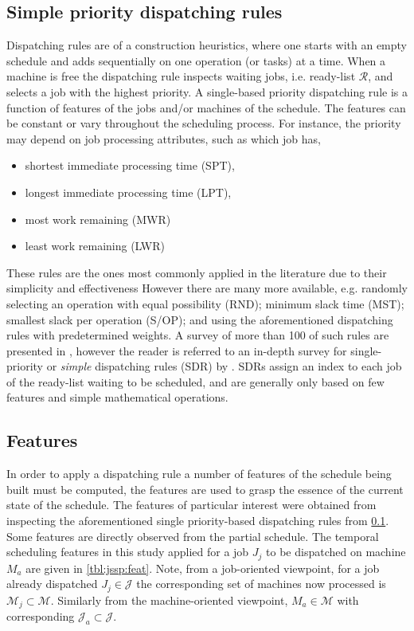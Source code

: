 \documentclass[smallextended]{svjour3}
\begin{document}
\subsection{Simple priority dispatching rules}\label{ch:dispatchrules}
Dispatching rules are of a construction heuristics, where one starts with an empty schedule and adds sequentially on one operation (or tasks) at a time. When a machine is free the dispatching rule inspects waiting jobs, i.e. ready-list $\mathcal{R}$, and selects a job with the highest priority. A single-based priority dispatching rule is a function of features of the jobs and/or machines of the schedule. The features can be constant or vary throughout the scheduling process. For instance, the priority may depend on job processing attributes, such as which job has, 
\begin{itemize}
\item shortest immediate processing time (SPT),  
\item longest immediate processing time (LPT), 
\item most work remaining (MWR) 
\item least work remaining (LWR)
\end{itemize}
These rules are the ones most commonly applied in the literature due to their simplicity and effectiveness %
However there are many more available, e.g. randomly selecting an operation with equal possibility (RND); minimum slack time (MST); smallest slack per operation (S/OP); and using the aforementioned dispatching rules with predetermined weights. A survey of more than 100 of such rules are presented in \citet{Panwalkar77}, however the reader is referred to an in-depth survey for single-priority or \emph{simple} dispatching rules (SDR) by \citet{Haupt89}. 
SDRs assign an index to each job of the ready-list waiting to be scheduled, and are generally only based on few features and simple mathematical operations. 


\subsection{Features}
In order to apply a dispatching rule a number of features of the schedule being built must be computed, the features are used to grasp the essence of the current state of the schedule. The features of particular interest were obtained from inspecting the aforementioned single priority-based dispatching rules from \cref{ch:dispatchrules}. Some features are directly observed from the partial schedule. The  temporal scheduling features in this study applied for a job $J_j$ to be dispatched on machine $M_a$ are given in \cref{tbl:jssp:feat}.  
Note, from a job-oriented viewpoint, for a job already dispatched $J_j\in\mathcal{J}$ the corresponding set of machines now processed is $\mathcal{M}_j\subset\mathcal{M}$. Similarly from the machine-oriented viewpoint, $M_a\in\mathcal{M}$ with corresponding $\mathcal{J}_a\subset\mathcal{J}$. 
\end{document}
